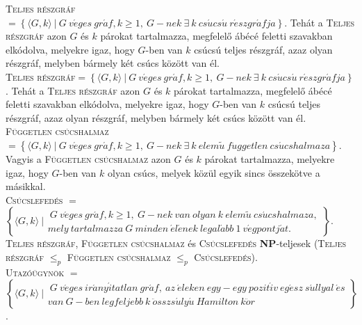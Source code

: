 \documentclass[margin=0px]{article}
\begin{document}
\noindent \textsc{Teljes részgráf} $= \left\{\langle G, k \rangle \ | \ G \ v\acute{e}ges \ gr\acute{a}f, k \geq 1, \ G-nek \ \exists \ k
    \ cs\acute{u}cs\acute{u} \ r\acute{e}szgr\acute{a}fja  \right\}$.
Tehát a \textsc{Teljes részgráf} azon $G$ és $k$ párokat tartalmazza, megfelelő ábécé feletti
szavakban elkódolva, melyekre igaz, hogy $G$-ben van $k$ csúcsú teljes részgráf,
azaz olyan részgráf, melyben bármely két csúcs között van él.\\

\noindent \textsc{Teljes részgráf}$= \left\{\langle G, k \rangle \ | \ G \ v\acute{e}ges \ gr\acute{a}f, k \geq 1, \ G-nek \ \exists \ k
    \ cs\acute{u}cs\acute{u} \ r\acute{e}szgr\acute{a}fja  \right\}$.
Tehát a \textsc{Teljes részgráf} azon $G$ és $k$ párokat tartalmazza, megfelelő ábécé feletti
szavakban elkódolva, melyekre igaz, hogy $G$-ben van $k$ csúcsú teljes részgráf,
azaz olyan részgráf, melyben bármely két csúcs között van él.\\

\noindent \textsc{Független csúcshalmaz} $= \left\{\langle G, k \rangle \ | \ G \ v\acute{e}ges \ gr\acute{a}f, k \geq 1, \ G-nek \ \exists \ k	\ elem\tilde{u} \ f\ddot{u}ggetlen \ cs\acute{u}cshalmaza  \right\}$.
Vagyis a  \textsc{Független csúcshalmaz} azon $G$ és $k$ párokat tartalmazza, melyekre
igaz, hogy $G$-ben van $k$ olyan csúcs, melyek közül egyik sincs összekötve a
másikkal.\\

\noindent \textsc{Csúcslefedés} $=$\\
$\left\{\langle G, k \rangle \ | \begin{array}{lr}
        \ G \ v\acute{e}ges \ gr\acute{a}f, k \geq 1, \ G-nek \ van \ olyan \ k	\ elem\tilde{u} \ cs\acute{u}cshalmaza, \\
        mely \ tartalmazza \ G \ minden \ \acute{e}l\acute{e}nek \ legal\acute{a}bb \ 1 \ v\acute{e}gpontj\acute{a}t.
    \end{array}
    \right\}$.\\


\noindent \textsc{Teljes részgráf}, \textsc{Független csúcshalmaz} és \textsc{Csúcslefedés} \textbf{NP}-teljesek
(\textsc{Teljes részgráf} $\leq_{p}$ \textsc{Független csúcshalmaz} $\leq_{p}$ \textsc{Csúcslefedés}).\\

\noindent \textsc{Utazóügynök} $=$\\
$\left\{\langle G, k \rangle \ |
    \begin{array}{lr}
        \ G \ v\acute{e}ges \ ir\acute{a}ny\acute{i}tatlan \ gr\acute{a}f, \ az \ \acute{e}leken \ egy-egy \
        pozit\acute{i}v \ eg\acute{e}sz \ s\acute{u}llyal \ \acute{e}s \\
        van \ G-ben \ legfeljebb \ k \ \ddot{o}sszs\acute{u}ly\acute{u} \ Hamilton \ k\ddot{o}r
    \end{array}
    \right\}$.\\
\end{document}
